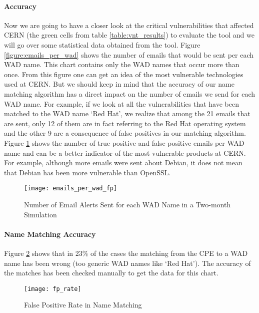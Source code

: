 \paragraph{Accuracy}
Now we are going to have a closer look at the critical vulnerabilities that affected CERN (the green cells from table \ref{table:vnt_results}) to evaluate the tool and we will go over some statistical data obtained from the tool.
Figure \ref{figure:emails_per_wad} shows the number of emails that would be sent per each WAD name. This chart contains only the WAD names that occur more than once. From this figure one can get an idea of the most vulnerable technologies used at CERN. But we should keep in mind that the accuracy of our name matching algorithm has a direct impact on the number of emails we send for each WAD name. For example, if we look at all the vulnerabilities that have been matched to the WAD name `Red Hat', we realize that among the 21 emails that are sent, only 12 of them are in fact referring to the Red Hat operating system and the  other 9 are a consequence of false positives in our matching algorithm. Figure \ref{figure:emails_per_wad_fp} shows the number of true positive and false positive emails per WAD name and can be a better indicator of the most vulnerable products at CERN. For example, although more emails were sent about Debian, it does not mean that Debian has been more vulnerable than OpenSSL.
\\
\begin{figure}[H]
  \centering
    \texttt{[image: emails\_per\_wad\_fp]}
  \caption{Number of Email Alerts Sent for each WAD Name in a Two-month Simulation}
  \label{figure:emails_per_wad_fp}

\end{figure}



\paragraph{Name Matching Accuracy}
Figure \ref{figure:fp_rate} shows that in 23\% of the cases the matching from the CPE to a WAD name has been wrong (too generic WAD names like `Red Hat'). The accuracy of the matches has been checked manually to get the data for this chart.

\begin{figure}[H]
  \centering
    \texttt{[image: fp\_rate]}
  \caption{False Positive Rate in Name Matching}
  \label{figure:fp_rate}

\end{figure}


